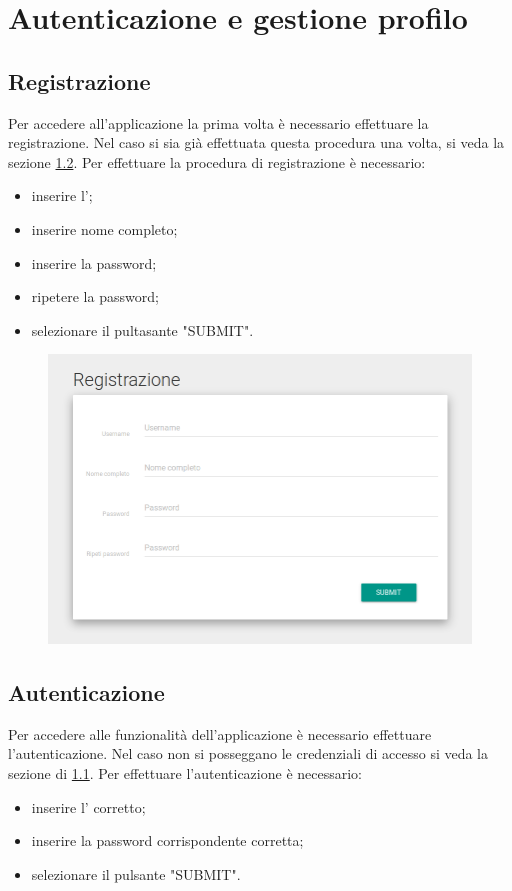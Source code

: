 \documentclass[12pt,a4paper]{article}
\begin{document}
	\newpage
	\section{Autenticazione e gestione profilo}
	\subsection{Registrazione}\label{registrazione}
	Per accedere all'applicazione la prima volta è necessario effettuare la registrazione. Nel caso si sia già effettuata questa procedura una volta, si veda la sezione \ref{autenticazione}.
	Per effettuare la procedura di registrazione è necessario:
	\begin{itemize}
		\item inserire l';
		\item inserire nome completo;
		\item inserire la password;
		\item ripetere la password;
		\item selezionare il pultasante "SUBMIT". 
	\end{itemize}

\begin{figure}[h]
		
\centering
\includegraphics[width=0.8\linewidth]{../img/screenshot/signup.png}
\caption{}
\label{Schermata di registrazione}
\end{figure}


	\subsection{Autenticazione}\label{autenticazione}
	Per accedere alle funzionalità dell'applicazione è necessario effettuare l'autenticazione. Nel caso non si posseggano le credenziali di accesso si veda la sezione di \ref{registrazione}.
	Per effettuare l'autenticazione è necessario:
	\begin{itemize}
		\item inserire l' corretto;
		\item inserire la password corrispondente corretta;
		\item selezionare il pulsante "SUBMIT".
	\end{itemize}
	
\end{document}
